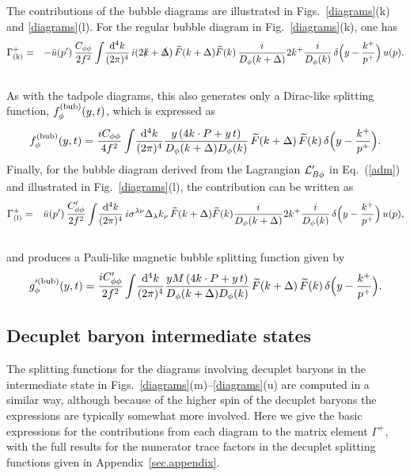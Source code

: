 \documentclass[preprintnumbers,prd,superscriptaddress,preprint]{revtex4-1}
\begin{document}
The contributions of the bubble diagrams are illustrated in Figs.~\ref{diagrams}(k) and \ref{diagrams}(l).
For the regular bubble diagram in Fig.~\ref{diagrams}(k), one has
%
\begin{eqnarray} 
\Gamma_{\rm (k)}^+
&=&-\bar{u}(p')\,
\frac{C_{\phi\phi}}{2f^2}
\int\!\frac{\dd[4]{k}}{(2\pi)^4}\,
i(2\slashed{k}+\slashed{\Delta})\,
\widetilde{F}(k+\Delta)
\widetilde{F}(k)\,
\frac{i}{D_\phi(k+\Delta)}
2k^+
\frac{i}{D_\phi(k)}\,
\delta\Big(y-\frac{k^+}{p^+}\Big)\,
u(p).
\notag\\
&&
\end{eqnarray}
%
As with the tadpole diagrams, this also generates only a Dirac-like splitting function, $f^{({\rm bub})}_\phi(y,t)$, which is expressed as
%
\begin{eqnarray} 
\label{eq:f_phi_bub}
f^{({\rm bub})}_\phi(y,t)
= \frac{iC_{\phi\phi}}{4 f^2}
\int\!\frac{\dd[4]{k}}{(2\pi)^4}
\frac{y\, (4k\cdot P+y\, t)}{D_\phi(k+\Delta) D_\phi(k)}\,
\widetilde{F}(k+\Delta)\,
\widetilde{F}(k)\,
\delta\Big(y-\frac{k^+}{p^+}\Big).
\end{eqnarray}
%
Finally, for the bubble diagram derived from the Lagrangian ${\cal L}_{B\phi}'$ in Eq.~(\ref{adm}) and illustrated in Fig.~\ref{diagrams}(l), the contribution can be written as
%
\begin{eqnarray} 
\Gamma_{\rm (l)}^+
&=& \bar{u}(p')\,
\frac{C'_{\phi\phi}}{2f^2}
\int\!\frac{\dd[4]{k}}{(2\pi)^4}\,
i\sigma^{\lambda\nu}\Delta_\lambda k_\nu\, \widetilde{F}(k+\Delta)
\widetilde{F}(k)
\frac{i}{D_\phi(k+\Delta)}
2k^+
\frac{i}{D_\phi(k)}\,
\delta\Big(y-\frac{k^+}{p^+}\Big)\,
u(p),
\notag\\
&&
\end{eqnarray}
%
and produces a Pauli-like magnetic bubble splitting function given by
%
\begin{eqnarray}
\label{eq:gpr_phi_bub}
g'^{({\rm bub})}_\phi(y,t)
=\frac{iC'_{\phi\phi}}{2f^2}
\int\!\frac{\dd[4]{k}}{(2\pi)^4}
\frac{y M\, (4k\cdot P + y\, t )}{D_\phi(k+\Delta)D_\phi(k)}\,
\widetilde{F}(k+\Delta)\, \widetilde{F}(k)\,
\delta\Big(y-\frac{k^+}{p^+}\Big).
\end{eqnarray}


\subsection{Decuplet baryon intermediate states}
\label{ssec.fy_decuplet}

The splitting functions for the diagrams involving decuplet baryons in the intermediate state in Figs.~\ref{diagrams}(m)--\ref{diagrams}(u) are computed in a similar way, although because of the higher spin of the decuplet baryons the expressions are typically somewhat more involved.
Here we give the basic expressions for the contributions from each diagram to the matrix element $\Gamma^+$, with the full results for the numerator trace factors in the decuplet splitting functions given in Appendix~\ref{sec.appendix}.
\end{document}
